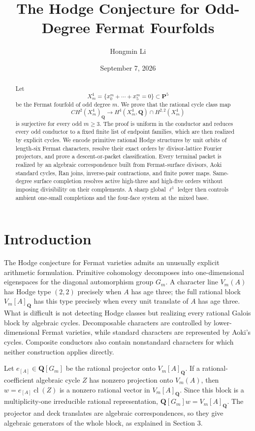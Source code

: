 \documentclass[11pt]{amsart}
\title{The Hodge Conjecture for Odd-Degree Fermat Fourfolds}
\author{Hongmin Li}
\date{September 7, 2026}
\numberwithin{theorem}{section}
\theoremstyle{remark}
\numberwithin{equation}{section}
\begin{document}
\begin{abstract}

Let
\[
X_m^4=\{x_0^m+\cdots+x_5^m=0\}\subset \mathbf P^5
\]
be the Fermat fourfold of odd degree \(m\). We prove that the rational cycle
class map
\[
CH^2(X_m^4)_{\mathbf Q}\longrightarrow
H^4(X_m^4,\mathbf Q)\cap H^{2,2}(X_m^4)
\]
is surjective for every odd \(m\ge 3\). The proof is uniform in the conductor
and reduces every odd conductor to a fixed finite list of endpoint families,
which are then realized by explicit cycles. We encode primitive rational Hodge
structures by unit orbits of length-six Fermat characters, resolve their exact
orders by divisor-lattice Fourier projectors, and prove a descent-or-packet
classification. Every terminal packet is realized by an algebraic
correspondence built from Fermat-surface divisors, Aoki standard cycles, Ran
joins, inverse-pair contractions, and finite power maps. Same-degree surface
completion resolves active high-three and high-five orders without imposing
divisibility on their complements. A sharp global \(\ell^1\) ledger then
controls ambient one-small completions and the four-face system at the
mixed base.

\end{abstract}
\maketitle
\section{Introduction}\label{sec:1}

The Hodge conjecture for Fermat varieties admits an unusually explicit
arithmetic formulation. Primitive cohomology decomposes into one-dimensional
eigenspaces for the diagonal automorphism group \(G_m\). A character line
\(V_m(A)\) has Hodge type \((2,2)\) precisely when \(A\) has age three;
the full rational block \(V_m[A]_{\mathbf Q}\) has this type precisely when
every unit translate of \(A\) has age three. What is difficult is not
detecting Hodge classes but
realizing every rational Galois block by algebraic cycles. Decomposable
characters are controlled by lower-dimensional Fermat varieties, while
standard characters are represented by Aoki's cycles. Composite conductors
also contain nonstandard characters for which neither construction applies
directly.

Let \(e_{[A]}\in\mathbf Q[G_m]\) be the rational projector onto
\(V_m[A]_{\mathbf Q}\). If a rational-coefficient algebraic cycle \(Z\)
has nonzero projection onto \(V_m(A)\), then
\(w=e_{[A]}\operatorname{cl}(Z)\) is a nonzero rational vector in
\(V_m[A]_{\mathbf Q}\). Since this block is a multiplicity-one irreducible
rational representation, \(\mathbf Q[G_m]w=V_m[A]_{\mathbf Q}\).
The projector and deck translates are algebraic correspondences, so they
give algebraic generators of the whole block, as explained in Section 3.
\end{document}
